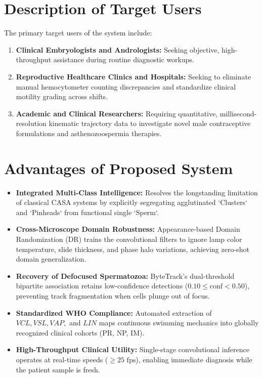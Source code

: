 \documentclass[12pt,a4paper]{report}
\begin{document}
\section{Description of Target Users}
The primary target users of the system include:
\begin{enumerate}
    \item \textbf{Clinical Embryologists and Andrologists:} Seeking objective, high-throughput assistance during routine diagnostic workups.
    \item \textbf{Reproductive Healthcare Clinics and Hospitals:} Seeking to eliminate manual hemocytometer counting discrepancies and standardize clinical motility grading across shifts.
    \item \textbf{Academic and Clinical Researchers:} Requiring quantitative, millisecond-resolution kinematic trajectory data to investigate novel male contraceptive formulations and asthenozoospermia therapies.
\end{enumerate}

\section{Advantages of Proposed System}
\begin{itemize}
    \item \textbf{Integrated Multi-Class Intelligence:} Resolves the longstanding limitation of classical CASA systems by explicitly segregating agglutinated `Clusters` and `Pinheads` from functional single `Sperm`.
    \item \textbf{Cross-Microscope Domain Robustness:} Appearance-based Domain Randomization (DR) trains the convolutional filters to ignore lamp color temperature, slide thickness, and phase halo variations, achieving zero-shot domain generalization.
    \item \textbf{Recovery of Defocused Spermatozoa:} ByteTrack's dual-threshold bipartite association retains low-confidence detections ($0.10 \le \text{conf} < 0.50$), preventing track fragmentation when cells plunge out of focus.
    \item \textbf{Standardized WHO Compliance:} Automated extraction of $VCL, VSL, VAP,$ and $LIN$ maps continuous swimming mechanics into globally recognized clinical cohorts (PR, NP, IM).
    \item \textbf{High-Throughput Clinical Utility:} Single-stage convolutional inference operates at real-time speeds ($\ge 25\text{ fps}$), enabling immediate diagnosis while the patient sample is fresh.
\end{itemize}
\end{document}

